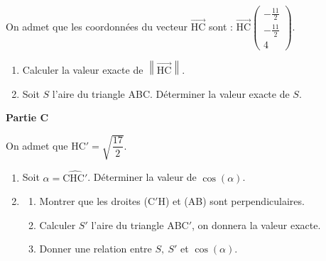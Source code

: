 \documentclass[10pt]{article}
\providecommand{\vect}[1]{\overrightarrow{#1}}
\begin{document}
\medskip

On admet que les coordonnées du vecteur $\vect{\text{HC}}$ sont : $\vect{\text{HC}}\begin{pmatrix}- \frac{11}{2}\\- \frac{11}{2}\\4\end{pmatrix}$.

\medskip

\begin{enumerate}
\item Calculer la valeur exacte de $\left\|\vect{\text{HC}}\right\|$.
\item Soit $S$ l'aire du triangle ABC. Déterminer la valeur exacte de $S$.
\end{enumerate}

\medskip

\textbf{Partie C}

\medskip

On admet que HC$'= \sqrt{\dfrac{17}{2}}$.

\medskip

\begin{enumerate}
\item Soit $\alpha = \widehat{\text{CHC}'}$. Déterminer la valeur de $\cos(\alpha)$.
\item 
	\begin{enumerate}
		\item Montrer que les droites (C$'$H) et (AB) sont perpendiculaires.
		\item Calculer $S'$ l'aire du triangle ABC$'$, on donnera la valeur exacte.
		\item Donner une relation entre $S,\: S'$ et $\cos (\alpha)$.
	\end{enumerate}
\end{enumerate}
\end{document}
